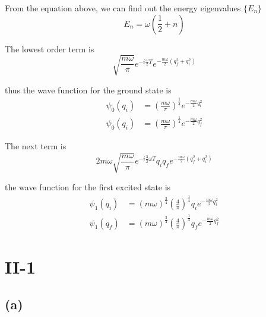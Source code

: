 \documentclass[12pt]{article}
\begin{document}
From the equation above, we can find out the energy eigenvalues $\{E_n\}$
\begin{equation*}
    E_n=\omega(\frac{1}{2}+n)
\end{equation*}

The lowest order term is 
\begin{equation*}
    \sqrt{\frac{m\omega}{\pi}}e^{-i\frac{\omega}{2}T}e^{-\frac{m\omega}{2}
    (q_f^2+q_i^2)}
\end{equation*}

thus the wave function for the ground state is 
\begin{equation*}
    \begin{split}
        \psi_0(q_i)&=(\frac{m\omega}{\pi})^{\frac{1}{4}}e^{-\frac{m\omega}
        {2}q_i^2}\\
        \psi_0(q_i)&=(\frac{m\omega}{\pi})^{\frac{1}{4}}e^{-\frac{m\omega}
        {2}q_f^2}
    \end{split}
\end{equation*}

The next term is
\begin{equation*}
    2m\omega\sqrt{\frac{m\omega}{\pi}}e^{-i\frac{3}{2}\omega T}q_iq_f
    e^{-\frac{m\omega}{2}(q_f^2+q_i^2)}
\end{equation*}

the wave function for the first excited state is 
\begin{equation*}
    \begin{split}
        \psi_1(q_i)&=(m\omega)^{\frac{3}{4}}(\frac{4}{\pi})^{\frac{1}{4}}
        q_ie^{-\frac{m\omega}{2}q_i^2}\\
        \psi_1(q_f)&=(m\omega)^{\frac{3}{4}}(\frac{4}{\pi})^{\frac{1}{4}}
        q_fe^{-\frac{m\omega}{2}q_f^2}
    \end{split}
\end{equation*}

\section*{II-1}

\subsection*{(a)}
\end{document}
